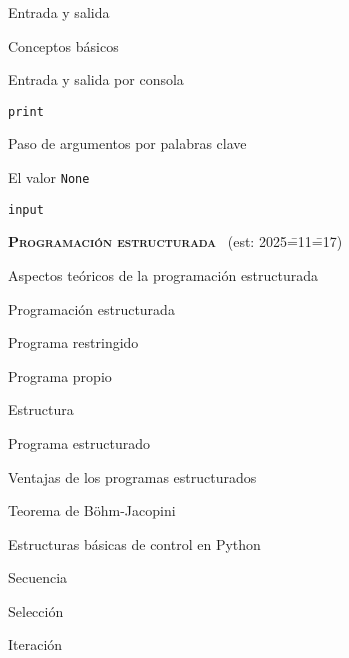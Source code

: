 \begin{longenum}
\begin{longenum}
\begin{longenum}
\begin{longenum}
            \end{longenum}
        \end{longenum}
        \item Entrada y salida
        \begin{longenum}
            \item Conceptos básicos
            \item Entrada y salida por consola
            \begin{longenum}
                \item \texttt{print}
                \begin{longenum}
                    \item Paso de argumentos por palabras clave
                    \item El valor \texttt{None}
                \end{longenum}
                \item \texttt{input}
            \end{longenum}
        \end{longenum}
    \end{longenum}
    \item \textbf{\textsc{Programación estructurada}} \ (est: 2025\==11\==17)
    \begin{longenum}
        \item Aspectos teóricos de la programación estructurada
        \begin{longenum}
            \item Programación estructurada
            \item Programa restringido
            \item Programa propio
            \item Estructura
            \item Programa estructurado
            \begin{longenum}
                \item Ventajas de los programas estructurados
            \end{longenum}
            \item Teorema de Böhm-Jacopini
        \end{longenum}
        \item Estructuras básicas de control en Python
        \begin{longenum}
            \item Secuencia
            \item Selección
            \item Iteración

\end{longenum}
\end{longenum}
\end{longenum}
